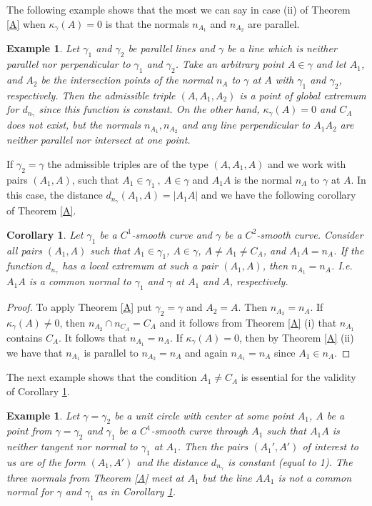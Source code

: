 \documentclass[a4paper,12pt]{amsart}
\newtheorem{cor}[thm]{Corollary}
\newtheorem{exam}[thm]{Example}
\def\g{\gamma}
\begin{document}
The following example shows that the most we can say in case (ii)
of Theorem \ref{A} when $\kappa_{\g}(A)=0$ is that the normals
$n_{A_1}$ and $n_{A_2}$ are parallel.
\smallskip

\begin{exam}\label{ex1} Let $\g_1$ and $\g_2$ be parallel lines and $\g$ be a line
which is neither parallel nor perpendicular to $\g_1$ and $\g_2$.
Take an arbitrary point $A\in \g$ and let $A_1$, and $A_2$ be the
intersection points of the normal $n_A$ to $\g$ at $A$ with $\g_1$
and $\g_2$, respectively. Then the admissible triple $(A, A_1, A_2)$ is a point of global extremum for
$d_{n_{\g}}$ since this function is constant. On the
other hand, $\kappa_{\g}(A)=0$ and $C_A$ does not exist, but the normals
$n_{A_1}, n_{A_2}$ and any line perpendicular to $A_1A_2$ are
neither parallel nor intersect at one point.
\end{exam}
\smallskip

If $\g_2=\g$ the admissible triples are of the type
$(A, A_1, A)$ and we work with pairs
$(A_1,A)$, such that $A_1\in \g_1 \ , \ A\in \g $ and $A_1A$ is the normal $n_A$ to $\g$ at $A$. In this case, the distance $d_{n_{\g}}(A_1,A) =|A_1A|$ and we have the following corollary of Theorem \ref{A}.

\begin{cor}\label{cor1} Let $\g_1$ be a $C^1$-smooth curve and
$\g$ be a $C^2$-smooth curve. Consider all pairs
$(A_1,A)$ such that $A_1\in \g_1$, $A\in \g$,
$A \neq A_1\neq C_A$, and $A_1A=n_A$. If the function
$d_{n_{\g}}$ has a local extremum at such a pair
$(A_1, A)$, then
$n_{A_1}=n_A$. I.e. $A_1A$ is a common normal to $\g_1$ and $\g$
at $A_1$ and $A$, respectively.
\end{cor}

\begin{proof} To apply Theorem \ref{A} put
$\g_2=\g$ and $A_2=A$. Then $n_{A_2}=n_A$. If $\kappa_{\g}(A)\neq 0$,
then $n_{A_2}\cap n_{C_A}=C_A$ and it follows from Theorem \ref{A} (i) that $n_{A_1}$ contains $C_A$. It follows that $n_{A_1}=n_A$.
If $\kappa_{\g}(A)=0$, then by Theorem \ref{A} (ii) we have that $n_{A_1}$ is parallel to $n_{A_2}=n_A$
and again $n_{A_1}=n_A$ since $A_1\in n_A$.
\end{proof}

The next example shows that the condition $A_1\neq C_A$ is
essential for the validity of Corollary \ref{cor1}.
\smallskip

\begin{exam}\label{ex2} Let $\g= \g_2$ be a unit circle with center at some point
$A_1$, $A$ be a point from $ \g=\g_2$ and $\g_1$ be a $C^1$-smooth curve through $A_1$ such that
$A_1A$ is neither tangent nor normal to $\g_1$
at $A_1$. Then the pairs $(A_1', A')$ of interest to us are of the form
$(A_1, A')$ and the distance
$d_{n_{\g}}$ is constant (equal to 1).
The three normals from Theorem \ref{A} meet at $A_1$ but the line $AA_1$ is not a common normal for $\g$ and $\g_1$ as in Corollary \ref{cor1}.

\end{exam}
\smallskip
\end{document}
